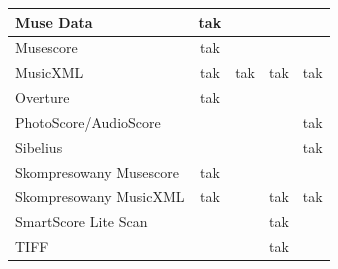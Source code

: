 \documentclass[polish,thesis,12pt]{dcsbook}
\begin{document}
\begin{center}
\begin{longtable}{|l|c|c|c|c|}
Muse Data                                     & tak       &          &        &          \\ \hline
Musescore                                     & tak       &          &        &          \\ \hline
MusicXML                                      & tak       & tak      & tak    & tak      \\ \hline
Overture                                      & tak       &          &        &          \\ \hline
PhotoScore/AudioScore                         &           &          &        & tak      \\ \hline
Sibelius                                      &           &          &        & tak      \\ \hline
Skompresowany Musescore                       & tak       &          &        &          \\ \hline
Skompresowany MusicXML                        & tak       &          & tak    & tak      \\ \hline
SmartScore Lite Scan                          &           &          & tak    &          \\ \hline
TIFF                                          &           &          & tak    &          \\ \hline
\end{longtable}
\end{center}
\end{document}
